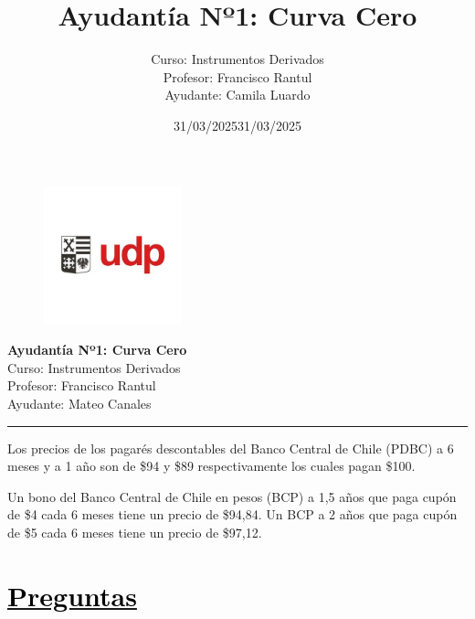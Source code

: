 \documentclass[12pt]{article}
\title{Ayudantía Nº1: Curva Cero}
\author{Curso: Instrumentos Derivados\\
Profesor: Francisco Rantul\\
Ayudante: Camila Luardo}
\date{31/03/2025}
\newcommand{\subrayadoRojo}[1]{{\color{rojoudp}\underline{\textcolor{black}{#1}}}}
\begin{document}
\begin{figure}
    \vspace{-5em}    
    \flushright
    \includegraphics[height=4cm]{../imagenes/logo.png}\\[-3em]
\end{figure}
\begin{center}
    {\LARGE \textbf{Ayudantía Nº1: Curva Cero}}\\[0.5em]
    Curso: Instrumentos Derivados\\
    Profesor: Francisco Rantul\\
    Ayudante: Mateo Canales\\
    \date{31/03/2025}
\end{center}
\vspace{1pt}
{\color{rojoudp}\hrule height 2pt}
\vspace{10pt}

Los precios de los pagarés descontables del Banco Central de Chile (PDBC)
 a 6 meses y a 1 año son de \$94 y \$89 respectivamente los cuales pagan \$100. 
  
 Un bono del Banco Central de Chile en pesos (BCP) a 1,5 años que paga cupón de 
 \$4 cada 6 meses tiene un precio de \$94{,}84. Un BCP a 2 años que paga
 cupón de \$5 cada 6 meses tiene un precio de \$97{,}12.

\section*{\subrayadoRojo{Preguntas}}
\end{document}
